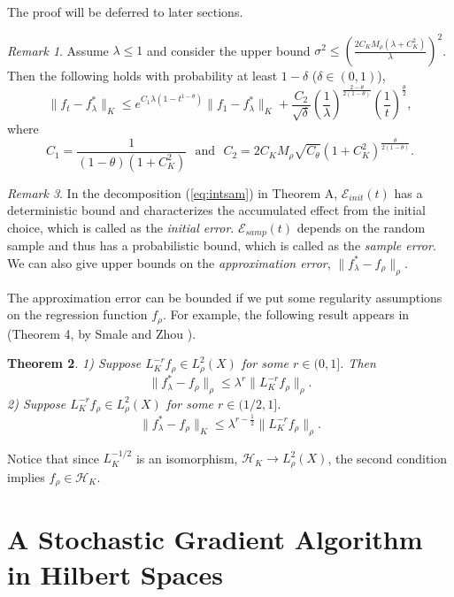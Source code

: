 \documentclass[twoside]{amsart}
\theoremstyle{theorem}
\newtheorem{thm}{Theorem}[section]
\theoremstyle{definition}
\theoremstyle{remark}
\newtheorem{rem}[thm]{Remark}
\def\H{{\mathscr H}}
\def\Err{{\mathscr E}}
\begin{document}
The proof will be deferred to later sections.

\begin{rem}
\label{rem:comparison}
Assume $\lambda\leq 1$ and consider the upper bound $\sigma^2 \leq \left(\frac{2C_K M_\rho (\lambda+C^2_K)}{\lambda} \right)^2$.
Then the following
holds with probability at least $1-\delta$ ($\delta\in (0,1)$),
\begin{equation} \label{eq:comparison}
\|f_t - f^\ast_\lambda\|_K \leq e^{C_1 \lambda (1-t^{1-\theta})} \|f_1 - f^\ast_\lambda\|_K
+ \frac{C_2}{\sqrt{\delta} } \left(\frac{1}{\lambda} \right)^{\frac{2-\theta}{2(1-\theta)}}
\left(\frac{1}{t}\right)^{\frac{\theta}{2}},
\end{equation}
where
\[ C_1=\frac{1}{(1-\theta)(1+C^2_K)}\ \ \ \mbox{and} \ \ \ C_2 = 2 C_K M_\rho \sqrt{C_\theta} \left( 1+C^2_K \right)^{\frac{\theta}{2(1-\theta)}}. \]
\end{rem}

\begin{rem}
\label{rem:total} In the decomposition (\ref{eq:intsam}) in
Theorem A, $\Err_{init}(t)$ has a deterministic bound and
characterizes the accumulated effect from the initial choice,
which is called as the \emph{initial error}. $\Err_{samp}(t)$
depends on the random sample and thus has a probabilistic bound,
which is called as the \emph{sample error}. We can also give upper
bounds on the \emph{approximation error},
$\|f^\ast_\lambda-f_\rho\|_\rho$.

The approximation error can be bounded if we put some regularity
assumptions on the regression function $f_\rho$. For example, the
following result appears in (Theorem 4, by Smale and Zhou
\cite{SmaZho-ShannonII}).

\begin{thm}
1) Suppose $L^{-r}_K f_\rho \in L^2_\rho (X)$ for some $r\in (0,1]$. Then
\[ \|f^\ast_\lambda-f_\rho \|_\rho \leq \lambda^{r} \| L^{-r}_K f_\rho \|_\rho. \]
2) Suppose $L^{-r}_K f_\rho \in L^2_\rho(X)$ for some $r\in (1/2,1]$.
\[ \|f^\ast_\lambda-f_\rho \|_K \leq \lambda^{r-\frac{1}{2}} \| L^{-r}_K f_\rho \|_\rho. \]
\end{thm}
Notice that since $L^{-1/2}_K$ is an isomorphism, $\H_K\to
L^2_\rho(X)$, the second condition implies $f_\rho \in \H_K$.
\end{rem}





\section{A Stochastic Gradient Algorithm in Hilbert Spaces}
\end{document}

